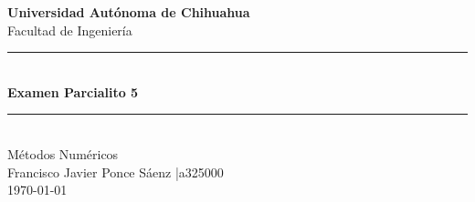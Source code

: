 \documentclass[12pt,letterpaper]{article}
\begin{document}

\begin{center}
  {\large\bfseries Universidad Autónoma de Chihuahua}\\[2pt]
  {\large Facultad de Ingeniería}\\[6pt]
  \rule{\linewidth}{0.8pt}\\[4pt]
  {\LARGE\bfseries Examen Parcialito 5}\\[4pt]
  \rule{\linewidth}{0.8pt}\\[6pt]
  {\large Métodos Numéricos}\\[4pt]
  {\large Francisco Javier Ponce Sáenz \quad|\quad a325000}\\[2pt]
  {\large\today}
\end{center}

\vspace{8pt}
\end{document}
